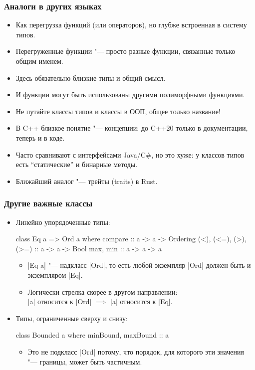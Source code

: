 \documentclass[10pt]{beamer}
\begin{document}
\begin{frame}[fragile]
  \frametitle{Аналоги в других языках}
  \begin{itemize}
    \item Как перегрузка функций (или операторов), но глубже встроенная в систему типов.
    \item Перегруженные функции "--- просто разные функции, связанные только общим именем.
    \item Здесь обязательно близкие типы и общий смысл.
    \item И функции могут быть использованы другими полиморфными функциями. \pause
    \item Не путайте классы типов и классы в ООП, общее только название!
    \item В C++ близкое понятие "--- концепции: до C++20 только в документации, теперь и в коде. \pause
    \item Часто сравнивают с интерфейсами Java/C\#, но это хуже: \pause у классов типов есть \enquote{статические} и бинарные методы. \pause
    \item Ближайший аналог "--- трейты (traits) в Rust.
  \end{itemize}
\end{frame}

\begin{frame}[fragile]
  \frametitle{Другие важные классы}
  \begin{itemize}
    \item
          Линейно упорядоченные типы:
          \begin{haskell}
            class Eq a => Ord a where
                compare :: a -> a -> Ordering
                (<), (<=), (>), (>=) :: a -> a -> Bool 
                max, min :: a -> a -> a
          \end{haskell}
          \begin{itemize}
            \item \haskinline|Eq a| "--- надкласс \haskinline|Ord|, то есть любой экземпляр \haskinline|Ord| должен быть и экземпляром \haskinline|Eq|. \pause
            \item Логически стрелка скорее в другом направлении:\\ \haskinline|a| относится к \haskinline|Ord| $\implies$ \haskinline|a| относится к \haskinline|Eq|.
          \end{itemize}
          \pause
    \item
          Типы, ограниченные сверху и снизу:
          \begin{haskell}
            class Bounded a where
                minBound, maxBound :: a 
          \end{haskell}
          \begin{itemize}
            \item Это не подкласс \haskinline|Ord| потому, что порядок, для которого эти значения "--- границы, может быть частичным.
          \end{itemize}
  \end{itemize}
\end{frame}
\end{document}
